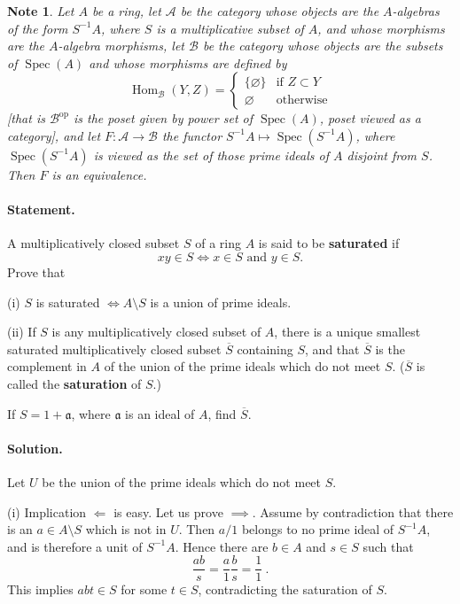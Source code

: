 \documentclass[12pt,letterpaper]{article}%
\newcommand{\oo}{\operatorname}\newcommand{\ooo}{\operatorname*}
\newcommand{\mf}{\mathfrak}
\newcommand{\aaa}{\mf a}
\newcommand{\ov}{\overline}
\newcommand{\Spec}{\operatorname{Spec}}\newcommand{\Sp}{\operatorname{Spec}}
\newcommand{\nn}{\noindent}
\newtheorem{note}[thm]{Note}
\begin{document}
\begin{note}\label{eqcat}
Let $A$ be a ring, let $\mathcal A$ be the category whose objects are the $A$-algebras of the form $S^{-1}A$, where $S$ is a multiplicative subset of $A$, and whose morphisms are the $A$-algebra morphisms, let $\mathcal B$ be the category whose objects are the subsets of $\Spec(A)$ and whose morphisms are defined by 
$$
\oo{Hom}_{\mathcal B}(Y,Z)=\begin{cases}\{\varnothing\}&\text{if }Z\subset Y\\ \varnothing&\text{otherwise}\end{cases}
$$ 
[that is $\mathcal B^{\oo{op}}$ is the poset given by power set of $\Spec(A)$, poset viewed as a category], and let $F:\mathcal A\to\mathcal B$ the functor $S^{-1}A\mapsto\Spec(S^{-1}A)$, where $\Spec(S^{-1}A)$ is viewed as the set of those prime ideals of $A$ disjoint from $S$. Then $F$ is an equivalence.
\end{note}

\paragraph{Statement.} 

A multiplicatively closed subset $S$ of a ring $A$ is said to be \textbf{saturated} if 
$$
xy\in S\iff x\in S\text{ and }y\in S.
$$
Prove that

\nn(i) $S$ is saturated $\iff A\setminus S$ is a union of prime ideals.

\nn(ii) If $S$ is any multiplicatively closed subset of $A$, there is a unique smallest saturated multiplicatively closed subset $\ov S$ containing $S$, and that $\ov S$ is the complement in $A$ of the union of the prime ideals which do not meet $S$. ($\ov S$ is called the \textbf{saturation} of $S$.)

\nn If $S=1+\aaa$, where $\aaa$ is an ideal of $A$, find $\ov S$.

\paragraph{Solution.}\label{ex3.7}%

Let $U$ be the union of the prime ideals which do not meet $S$.

\nn(i) Implication $\Longleftarrow$ is easy. Let us prove $\implies$. Assume by contradiction that there is an $a\in A\setminus S$ which is not in $U$. Then $a/1$ belongs to no prime ideal of $S^{-1}A$, and is therefore a unit of $S^{-1}A$. Hence there are $b\in A$ and $s\in S$ such that 
$$
\frac{ab}s=\frac a1\frac bs=\frac11\ .
$$ 
This implies $abt\in S$ for some $t\in S$, contradicting the saturation of $S$.
\end{document}
